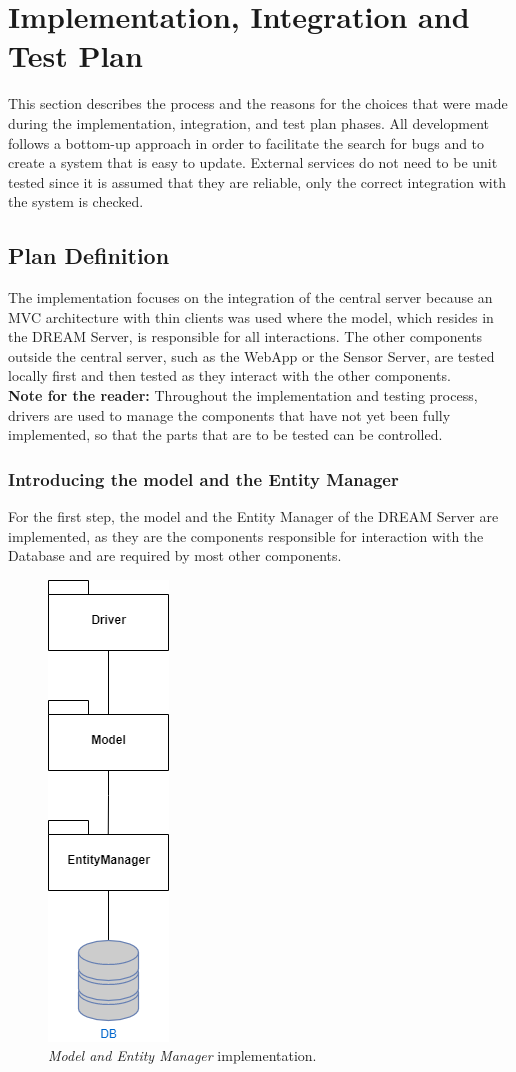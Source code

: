 \section{ Implementation, Integration and Test Plan}
This section describes the process and the reasons for the choices that were made during the implementation, integration, and test plan phases. All development follows a bottom-up approach in order to facilitate the search for bugs and to create a system that is easy to update. External services do not need to be unit tested since it is assumed that they are reliable, only the correct integration with the system is checked.
\subsection{Plan Definition}
The implementation focuses on the integration of the central server because an MVC architecture with thin clients was used where the model, which resides in the DREAM Server, is responsible for all interactions.  The other components outside the central server, such as the WebApp or the Sensor Server, are tested locally first and then tested as they interact with the other components.\\
\textbf{Note for the reader:} Throughout the implementation and testing process, drivers are used to manage the components that have not yet been fully implemented, so that the parts that are to be tested can be controlled.

\subsubsection{Introducing the model and the Entity Manager}
For the first step, the model and the Entity Manager of the DREAM Server are implemented, as they are the components responsible for interaction with the Database and are required by most other components.
\vspace{0.5cm}
\begin{figure}[H]
    \centering
    \includegraphics[scale=0.6]{Images/StepImplementation/Step1.png}
    \caption{\textit{Model and Entity Manager} implementation.}
\end{figure}
